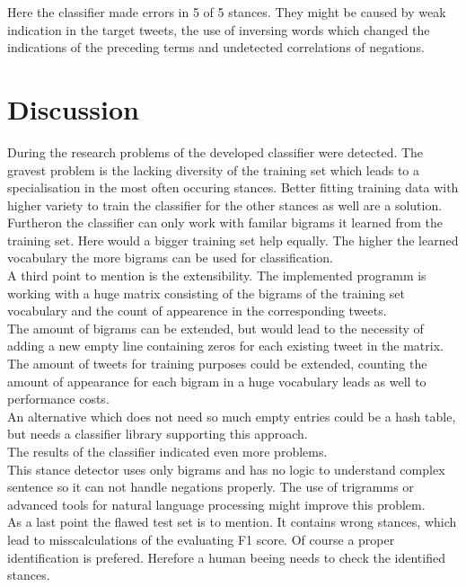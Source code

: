 \documentclass[a4paper,12pt,twoside]{article}
\begin{document}
Here the classifier made errors in 5 of 5 stances. They might be caused by weak indication in the target tweets, the use of inversing words which changed the indications of the preceding terms and undetected correlations of negations.
 
\section{Discussion}
During the research problems of the developed classifier were detected.
The gravest problem is the lacking diversity of the training set which leads to a specialisation in the most often occuring stances. Better fitting training data with higher variety to train the classifier for the other stances as well are a solution.\\ 
Furtheron the classifier can only work with familar bigrams it learned from the training set. Here would a bigger training set help equally. The higher the learned vocabulary the more bigrams can be used for classification. \\ 
A third point to mention is the extensibility. The implemented programm is working with a huge matrix consisting of the bigrams of the training set vocabulary and the count of appearence in the corresponding tweets.\\ 
The amount of bigrams can be extended, but would lead to the necessity of adding a new empty line containing zeros for each existing tweet in the matrix.\\
The amount of tweets for training purposes could be extended, counting the amount of appearance for each bigram in a huge vocabulary leads as well to performance costs.\\ 
An alternative which does not need so much empty entries could be a hash table, but needs a classifier library supporting this approach. \\
The results of the classifier indicated even more problems.\\
This stance detector uses only bigrams and has no logic to understand complex sentence so it can not handle negations properly. The use of trigramms or advanced tools for natural language processing might improve this problem.\\
As a last point the flawed test set is to mention. It contains wrong stances, which lead to misscalculations of the evaluating F1 score. Of course a proper identification is prefered. Herefore a human beeing needs to check the identified stances. 
\end{document}
